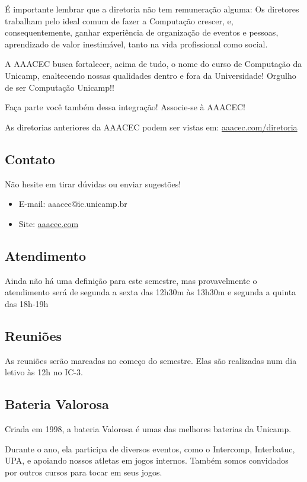 É importante lembrar que a diretoria não tem remuneração alguma: Os diretores
trabalham pelo ideal comum de fazer a Computação crescer, e, consequentemente,
ganhar experiência de organização de eventos e pessoas, aprendizado de valor
inestimável, tanto na vida profissional como social.

A AAACEC busca fortalecer, acima de tudo, o nome do curso de Computação da
Unicamp, enaltecendo nossas qualidades dentro e fora da Universidade! Orgulho de
ser Computação Unicamp!!

Faça parte você também dessa integração! Associe-se à AAACEC!

As diretorias anteriores da AAACEC podem ser vistas em:
\url{aaacec.com/diretoria}

\subsection{Contato}

Não hesite em tirar dúvidas ou enviar sugestões!

\begin{itemize}
\item  E-mail: aaacec@ic.unicamp.br
\item  Site: \url{aaacec.com}
\end{itemize}

\subsection{Atendimento}

Ainda não há uma definição para este semestre, mas provavelmente o atendimento
será de segunda a sexta das 12h30m às 13h30m e segunda a quinta das 18h-19h

\subsection{Reuniões}

As reuniões serão marcadas no começo do semestre. Elas são realizadas num dia
letivo às 12h no IC-3.

\subsection{Bateria Valorosa}

Criada em 1998, a bateria Valorosa é umas das melhores baterias da Unicamp.

Durante o ano, ela participa de diversos eventos, como o Intercomp, Interbatuc,
UPA, e apoiando nossos atletas em jogos internos. Também somos convidados por
outros cursos para tocar em seus jogos.

